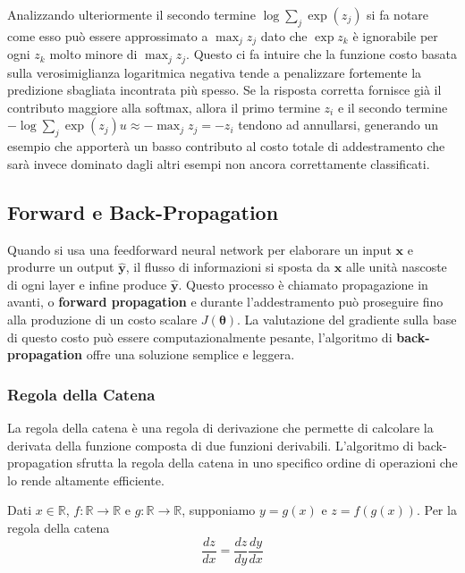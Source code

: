 \documentclass[12pt,a4paper]{report}
\begin{document}
    Analizzando ulteriormente il secondo termine 
    $\log\sum_j\exp(z_j)$ si fa notare come esso pu\`o essere
    approssimato a $\max_jz_j$ dato che $\exp z_k$ \`e ignorabile per 
    ogni $z_k$ molto minore di $\max_jz_j$. Questo ci fa intuire che la
    funzione costo basata sulla verosimiglianza logaritmica negativa 
    tende a penalizzare fortemente la predizione sbagliata incontrata 
    pi\`u spesso. Se la risposta corretta fornisce gi\`a il 
    contributo maggiore alla softmax, allora il primo termine $z_i$ e
    il secondo termine $-\log\sum_j\exp(z_j)u \approx -\max_j z_j=-z_i$
    tendono ad annullarsi, generando un esempio che apporter\`a un basso
    contributo al costo totale di addestramento che sar\`a invece 
    dominato dagli altri esempi non ancora correttamente classificati.

    \subsection{Forward e Back-Propagation} \label{sec:propagation}
    Quando si usa una feedforward neural network per elaborare un input
    $\boldsymbol{x}$ e produrre un output $\boldsymbol{\hat{y}}$,
    il flusso di informazioni si sposta da $\boldsymbol{x}$ alle unit\`a
    nascoste di ogni layer e infine produce $\boldsymbol{\hat{y}}$.
    Questo processo \`e chiamato propagazione in avanti, o 
    \textbf{forward propagation} e durante l'addestramento pu\`o 
    proseguire fino alla produzione di un costo scalare 
    $J(\boldsymbol{\theta})$. La valutazione del gradiente sulla base
    di questo costo pu\`o essere computazionalmente pesante,
    l'algoritmo di \textbf{back-propagation} offre una soluzione 
    semplice e leggera. 

    \subsubsection{Regola della Catena}
    La regola della catena \`e una regola di derivazione che permette
    di calcolare la derivata della funzione composta di due funzioni
    derivabili. L'algoritmo di back-propagation sfrutta la regola della
    catena in uno specifico ordine di operazioni che lo rende altamente
    efficiente.
    
    Dati $x\in\mathbb{R}$, $f:\mathbb{R}\rightarrow\mathbb{R}$ e 
    $g:\mathbb{R}\rightarrow\mathbb{R}$, supponiamo $y=g(x)$ e
    $z=f(g(x))$. Per la regola della catena
    \begin{equation} \label{eq:chain}
        \frac{dz}{dx}=\frac{dz}{dy}\frac{dy}{dx}
    \end{equation}
\end{document}
